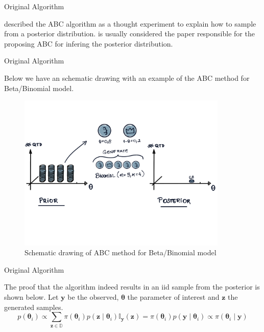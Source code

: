\documentclass[10pt]{beamer}
\begin{document}
\begin{frame}[fragile]{Original Algorithm}

  \citet{Rubin1984} described the ABC algorithm as a thought experiment
  to explain how to sample from a posterior distribution.
  \citet{Tavare505} is usually considered the paper responsible for the
  proposing ABC for infering the posterior distribution.

  \vspace{1cm}

\begin{algorithm}[H]
\SetAlgoLined
{}
 \caption{Original ABC method}
\end{algorithm}


\end{frame}

\begin{frame}[fragile]{Original Algorithm}

  Below we have an schematic drawing with an example of
  the ABC method for Beta/Binomial model.
    \begin{figure}[H]
        \centering
        \includegraphics[width=10cm]{images/Vis-ABC.png}
        \caption{Schematic drawing of ABC method for Beta/Binomial
        model
        }
    \end{figure}

\end{frame}

\begin{frame}[fragile]{Original Algorithm}

  The proof that the algorithm indeed results in an iid sample
  from the posterior is shown below. Let $\bm y$ be the observed,
  $\bm \theta$ the parameter of interest and $\bm z$ the generated
  samples.
  $$
  p(\bm \theta_i) \propto \sum_{\bm z \in \mathbb{D}}
  \pi(\bm \theta_i) p(\bm z \mid \bm \theta_i) \mathbb I_{\bm y}(\bm z)
  = \pi(\bm \theta_i) p(\bm y \mid \bm \theta_i) \propto
  \pi(\bm \theta_i \mid \bm y)
  $$

\end{frame}
\end{document}
